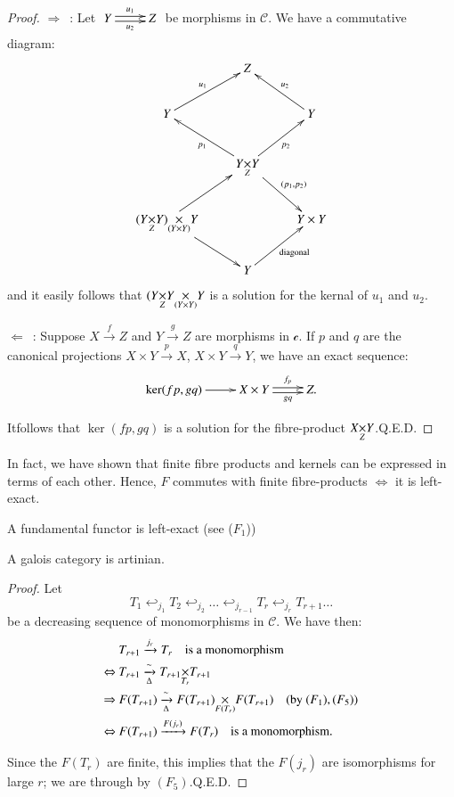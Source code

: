 \begin{proof}
$\Rightarrow$~: Let
  $\xymatrix{Y\ar@<.2em>[r]^{u_{1}}\ar@<-.2em>[r]_{u_{2}} & Z}$ be
  morphisms in $\mathscr{C}$. We have a commutative diagram:
\[
\xymatrix{
 & Z & \\
Y\ar[ur]^{u_{1}}  & & Y\ar[ul]_{u_{2}}\\
 &
\fprod{Y}{Y}{Z}\ar[ul]^{p_{1}}\ar[ur]_{p_{2}}\ar[dr]^{(p_{1},p_{2})}
&\\
\fprod{(\fprod{Y}{Y}{Z})}{Y}{(Y\times Y)}\ar[ur]\ar[dr] & & Y\times
Y\\
 & Y\ar[ur]_{\text{diagonal}} &  
}
\]
and it easily follows that $\fprod{(\fprod{Y}{Y}{Z}}{Y}{(Y\times Y)}$
is a solution for the kernal of $u_{1}$ and $u_{2}$.

$\Leftarrow$~: Suppose $X\xrightarrow{f}Z$ and $Y\xrightarrow{g}Z$ are
morphisms in $\mathscr{c}$. If $p$ and $q$ are the canonical
projections $X\times Y\xrightarrow{p}X$, $X\times Y\xrightarrow{q}Y$,
we have an exact sequence:
\[
\xymatrix{
\ker (fp,gq)\ar[r] & X\times Y\ar@<.2em>[r]^-{f_{p}}\ar@<-.2em>[r]_-{gq}
& Z. 
}
\]

It\pageoriginale follows that $\ker(fp,gq)$ is a solution for the
fibre-product $\fprod{X}{Y}{Z}$.\hfill Q.E.D.
\end{proof}

In fact, we have shown that finite fibre products and kernels can be
expressed in terms of each other. Hence, $F$ commutes with finite
fibre-products $\Leftrightarrow$ it is left-exact.

\begin{coro*}
A fundamental functor is left-exact (see ($F_{1}$))
\end{coro*}

\begin{sublemma}\label{chap4-lem4.4.1.3}
A galois category is artinian.
\end{sublemma}

\begin{proof}
Let 
$$
T_{1}\hookleftarrow_{j_{1}}T_{2}\hookleftarrow_{j_{2}}\ldots
\hookleftarrow_{j_{r-1}}T_{r}\hookleftarrow_{j_{r}}T_{r+1}\ldots
$$
be a decreasing sequence of monomorphisms in $\mathscr{C}$. We have
then:
\begin{align*}
& T_{r+1}\xrightarrow{j_{r}}T_{r}\quad\text{is a monomorphism}\\
\Leftrightarrow\ &
T_{r+1}\xrightarrow[\Delta]{\sim}\fprod{T_{r+1}}{T_{r+1}}{T_{r}}\\
\Rightarrow\ &
F(T_{r+1})\xrightarrow[\Delta]{\sim}\fprod{F(T_{r+1})}{F(T_{r+1})}{F(T_{r})}\quad
(\text{by\ } (F_{1}), (F_{5}))\\
\Leftrightarrow\ &
F(T_{r+1})\xrightarrow{F(j_{r})}F(T_{r})\quad\text{is a monomorphism.}  
\end{align*}

Since the $F(T_{r})$ are finite, this implies that the $F(j_{r})$ are
isomorphisms for large $r$; we are through by $(F_{5})$.\hfill Q.E.D.
\end{proof}


